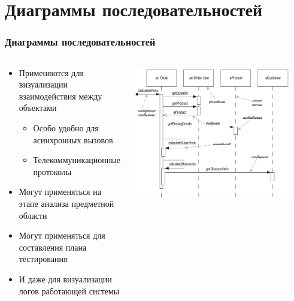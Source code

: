 \documentclass{../../slides-style}
\begin{document}
    \section{Диаграммы последовательностей}

    \begin{frame}
        \frametitle{Диаграммы последовательностей}
        \begin{columns}
            \begin{column}{0.5\textwidth}
                \begin{itemize}
                    \item Применяются для визуализации взаимодействия между объектами
                    \begin{itemize}
                        \item Особо удобно для асинхронных вызовов
                        \item Телекоммуникационные протоколы
                    \end{itemize}
                    \item Могут применяться на этапе анализа предметной области
                    \item Могут применяться для составления плана тестирования
                    \item И даже для визуализации логов работающей системы
                \end{itemize}
            \end{column}
            \begin{column}{0.5\textwidth}
                \begin{center}
                    \includegraphics[width=0.9\textwidth]{sequenceDiagramSyntax.png}
                \end{center}
            \end{column}
        \end{columns}
    \end{frame}
\end{document}
